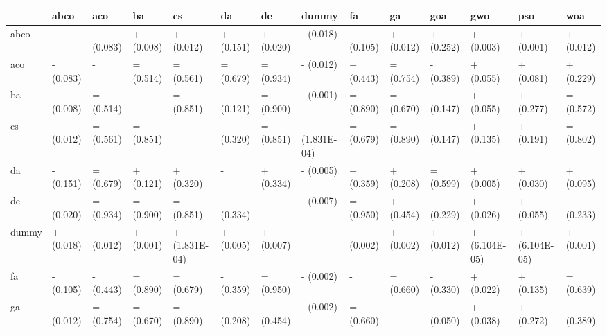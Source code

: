 \chapter{}

\begin{table}
    \centering
    \begin{adjustbox}{width=\linewidth}
        \begin{tabular}{llllllllllllll}
            \toprule
            {}    & abco      & aco       & ba        & cs            & da        & de        & dummy         & fa        & ga        & goa       & gwo           & pso           & woa       \\
            \midrule
            abco  & -         & + (0.083) & + (0.008) & + (0.012)     & + (0.151) & + (0.020) & - (0.018)     & + (0.105) & + (0.012) & + (0.252) & + (0.003)     & + (0.001)     & + (0.012) \\
            aco   & - (0.083) & -         & = (0.514) & = (0.561)     & = (0.679) & = (0.934) & - (0.012)     & + (0.443) & = (0.754) & - (0.389) & + (0.055)     & + (0.081)     & + (0.229) \\
            ba    & - (0.008) & = (0.514) & -         & = (0.851)     & - (0.121) & = (0.900) & - (0.001)     & = (0.890) & = (0.670) & - (0.147) & + (0.055)     & + (0.277)     & = (0.572) \\
            cs    & - (0.012) & = (0.561) & = (0.851) & -             & - (0.320) & = (0.851) & - (1.831E-04) & = (0.679) & = (0.890) & - (0.147) & + (0.135)     & + (0.191)     & = (0.802) \\
            da    & - (0.151) & = (0.679) & + (0.121) & + (0.320)     & -         & + (0.334) & - (0.005)     & + (0.359) & + (0.208) & = (0.599) & + (0.005)     & + (0.030)     & + (0.095) \\
            de    & - (0.020) & = (0.934) & = (0.900) & = (0.851)     & - (0.334) & -         & - (0.007)     & = (0.950) & + (0.454) & - (0.229) & + (0.026)     & + (0.055)     & - (0.233) \\
            dummy & + (0.018) & + (0.012) & + (0.001) & + (1.831E-04) & + (0.005) & + (0.007) & -             & + (0.002) & + (0.002) & + (0.012) & + (6.104E-05) & + (6.104E-05) & + (0.001) \\
            fa    & - (0.105) & - (0.443) & = (0.890) & = (0.679)     & - (0.359) & = (0.950) & - (0.002)     & -         & = (0.660) & - (0.330) & + (0.022)     & + (0.135)     & = (0.639) \\
            ga    & - (0.012) & = (0.754) & = (0.670) & = (0.890)     & - (0.208) & - (0.454) & - (0.002)     & = (0.660) & -         & - (0.050) & + (0.038)     & + (0.272)     & - (0.389) \\

\end{tabular}
\end{adjustbox}
\end{table}

